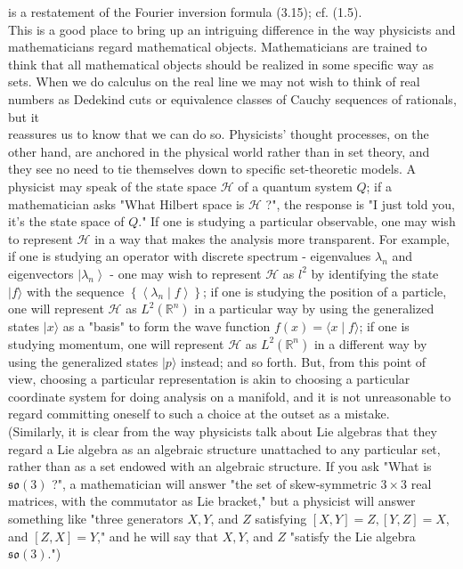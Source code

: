 \documentclass[10pt, letterpaper]{article}
\begin{document}
is a restatement of the Fourier inversion formula (3.15); cf. (1.5).\\
This is a good place to bring up an intriguing difference in the way physicists and mathematicians regard mathematical objects. Mathematicians are trained to think that all mathematical objects should be realized in some specific way as sets. When we do calculus on the real line we may not wish to think of real numbers as Dedekind cuts or equivalence classes of Cauchy sequences of rationals, but it\\
reassures us to know that we can do so. Physicists' thought processes, on the other hand, are anchored in the physical world rather than in set theory, and they see no need to tie themselves down to specific set-theoretic models. A physicist may speak of the state space $\mathcal{H}$ of a quantum system $Q$; if a mathematician asks "What Hilbert space is $\mathcal{H}$ ?", the response is "I just told you, it's the state space of $Q$." If one is studying a particular observable, one may wish to represent $\mathcal{H}$ in a way that makes the analysis more transparent. For example, if one is studying an operator with discrete spectrum - eigenvalues $\lambda_{n}$ and eigenvectors $\left|\lambda_{n}\right\rangle$ - one may wish to represent $\mathcal{H}$ as $l^{2}$ by identifying the state $|f\rangle$ with the sequence $\left\{\left\langle\lambda_{n} \mid f\right\rangle\right\}$; if one is studying the position of a particle, one will represent $\mathcal{H}$ as $L^{2}\left(\mathbb{R}^{n}\right)$ in a particular way by using the generalized states $|x\rangle$ as a "basis" to form the wave function $f(x)=\langle x \mid f\rangle$; if one is studying momentum, one will represent $\mathcal{H}$ as $L^{2}\left(\mathbb{R}^{n}\right)$ in a different way by using the generalized states $|p\rangle$ instead; and so forth. But, from this point of view, choosing a particular representation is akin to choosing a particular coordinate system for doing analysis on a manifold, and it is not unreasonable to regard committing oneself to such a choice at the outset as a mistake.\\
(Similarly, it is clear from the way physicists talk about Lie algebras that they regard a Lie algebra as an algebraic structure unattached to any particular set, rather than as a set endowed with an algebraic structure. If you ask "What is $\mathfrak{s o}(3)$ ?", a mathematician will answer "the set of skew-symmetric $3 \times 3$ real matrices, with the commutator as Lie bracket," but a physicist will answer something like "three generators $X, Y$, and $Z$ satisfying $[X, Y]=Z,[Y, Z]=X$, and $[Z, X]=Y$," and he will say that $X, Y$, and $Z$ "satisfy the Lie algebra $\mathfrak{s o}(3)$.")
\end{document}
